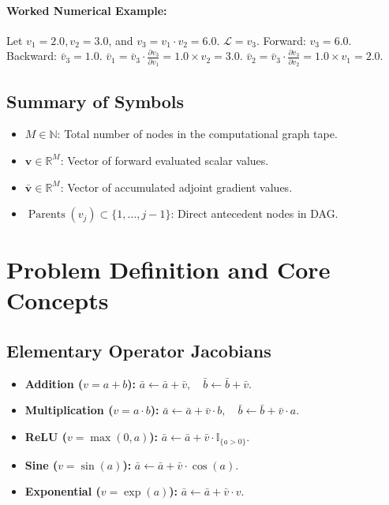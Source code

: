 \documentclass[11pt]{article}
\begin{document}
\paragraph{Worked Numerical Example:}
Let $v_1 = 2.0, v_2 = 3.0$, and $v_3 = v_1 \cdot v_2 = 6.0$. $\mathcal{L} = v_3$.
Forward: $v_3 = 6.0$.
Backward: $\bar{v}_3 = 1.0$.
$\bar{v}_1 = \bar{v}_3 \cdot \frac{\partial v_3}{\partial v_1} = 1.0 \times v_2 = 3.0$.
$\bar{v}_2 = \bar{v}_3 \cdot \frac{\partial v_3}{\partial v_2} = 1.0 \times v_1 = 2.0$.

\subsection{Summary of Symbols}
\begin{itemize}
    \item $M \in \mathbb{N}$: Total number of nodes in the computational graph tape.
    \item $\mathbf{v} \in \mathbb{R}^M$: Vector of forward evaluated scalar values.
    \item $\bar{\mathbf{v}} \in \mathbb{R}^M$: Vector of accumulated adjoint gradient values.
    \item $\operatorname{Parents}(v_j) \subset \{1, \dots, j-1\}$: Direct antecedent nodes in DAG.
\end{itemize}

\section{Problem Definition and Core Concepts}
\label{sec:problem_definition}

\subsection{Elementary Operator Jacobians}
\begin{itemize}
    \item \textbf{Addition ($v = a + b$):} $\bar{a} \gets \bar{a} + \bar{v}, \quad \bar{b} \gets \bar{b} + \bar{v}$.
    \item \textbf{Multiplication ($v = a \cdot b$):} $\bar{a} \gets \bar{a} + \bar{v} \cdot b, \quad \bar{b} \gets \bar{b} + \bar{v} \cdot a$.
    \item \textbf{ReLU ($v = \max(0, a)$):} $\bar{a} \gets \bar{a} + \bar{v} \cdot \mathbb{I}_{\{a > 0\}}$.
    \item \textbf{Sine ($v = \sin(a)$):} $\bar{a} \gets \bar{a} + \bar{v} \cdot \cos(a)$.
    \item \textbf{Exponential ($v = \exp(a)$):} $\bar{a} \gets \bar{a} + \bar{v} \cdot v$.
\end{itemize}
\end{document}
